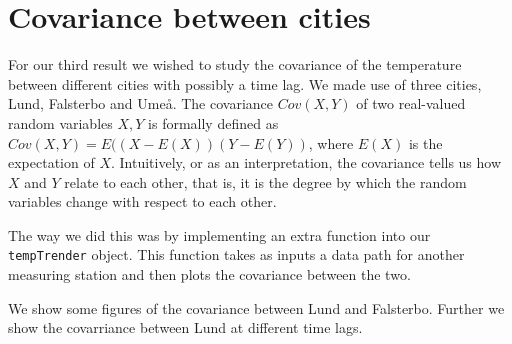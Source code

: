\section{Covariance between cities}

For our third result we wished to study the covariance of the temperature between different cities with possibly a time lag. We made use of three cities, Lund, Falsterbo and Umeå. The covariance $Cov(X,Y)$ of two real-valued random variables $X, Y$ is formally defined as $Cov(X,Y) = E((X-E(X))(Y-E(Y))$, where $E(X)$ is the expectation of $X$. Intuitively, or as an interpretation, the covariance tells us how $X$ and $Y$ relate to each other, that is, it is the degree by which the random variables change with respect to each other. 

The way we did this was by implementing an extra function into our \texttt{tempTrender} object. This function takes as inputs a data path for another measuring station and then plots the covariance between the two. 

We show some figures of the covariance between Lund and Falsterbo. Further we show the covarriance between  Lund at different time lags.


